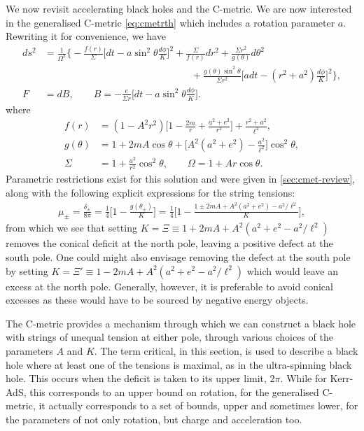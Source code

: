 \documentclass[
twoside,
openright,
frontopenright,
]{dmathesis}
\newcommand{\nn}{\nonumber}
\begin{document}
We now revisit accelerating black holes and the C-metric. We are now interested
in the generalised C-metric \eqref{eq:cmetrth} which includes a rotation
parameter $a$. Rewriting it for convenience, we have
\begin{align}
  ds^2 &= \frac{1}{\Omega^2}\bigg\{ -\frac{f(r)}{\Sigma}\Big[dt - a\sin^2\theta
         \frac{d\phi}{K} \Big]^2 + \frac{\Sigma}{f(r)}dr^2 + \frac{\Sigma
         r^2}{g(\theta)}d\theta^2 \nn\\
  &\hspace{15em} + \frac{g(\theta) \sin^2\theta}{\Sigma r^2} \Big[adt-(r^2+a^2)
    \frac{d\phi}{K}\Big]^2\bigg\},\nn\\ 
  F&=dB,\qquad B=-\frac{e}{\Sigma r}\Big[dt-a\sin^2\theta \frac{d\phi}{K}\Big].
\label{eq:cmetric4}
\end{align}
where
\begin{align}
f(r)&=(1-A^2r^2)\bigg[1-\frac{2m}{r}+\frac{a^2+e^2}{r^2}\bigg]+\frac{r^2+a^2}{\ell^2},\nn\\
g(\theta) &=
1+2mA\cos\theta+\bigg[A^2(a^2+e^2)-\frac{a^2}{\ell^2}\bigg]\cos^2\theta,\nn\\ 
\Sigma&=1+\frac{a^2}{r^2}\cos^2\theta, \qquad \Omega=1+Ar\cos\theta.
\label{eq:cmetric4-fun}
\end{align}
Parametric restrictions exist for this solution and were given in
\cref{sec:cmet-review}, along with the following explicit expressions for the
string tensions:
\begin{align}
  \label{eq:tensions}
  \mu_\pm = \frac{\delta_\pm}{8\pi}=\frac14\bigg[1-\frac{g(\theta_\pm)}{K}\bigg] =
  \frac14\bigg[1-\frac{1\pm 2mA + A^2(a^2+e^2)-a^2/\ell^2}{K}\bigg], 
\end{align}
from which we see that setting $K = \Xi \equiv 1 + 2mA + A^2(a^2 + e^2 -
a^2/\ell^2)$ removes the conical deficit at the north pole, leaving a positive
defect at the south pole. One could might also envisage removing the defect at
the south pole by setting $K = \Xi' \equiv 1 - 2mA + A^2(a^2 + e^2 -
a^2/\ell^2)$ which would leave an excess at the north pole. Generally, however,
it is preferable to avoid conical excesses as these would have to be sourced by
negative energy objects.

The C-metric provides a mechanism through which we can construct a black hole
with strings of unequal tension at either pole, through various choices of the
parameters $A$ and $K$. The term critical, in this section, is used to describe
a black hole where at least one of the tensions is maximal, as in the
ultra-spinning black hole. This occurs when the deficit is taken to its upper
limit, $2\pi$. While for Kerr-AdS, this corresponds to an upper bound on
rotation, for the generalised C-metric, it actually corresponds to a set of
bounds, upper and sometimes lower, for the parameters of not only rotation, but
charge and acceleration too.
\end{document}
